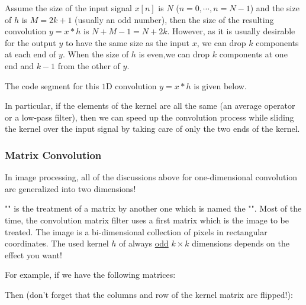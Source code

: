 	
	Assume the size of the input signal $x[n]$ is $N$ ($n=0,\cdots,n=N-1$) and the size of $h$ is $M=2k+1$ (usually an odd number), then the size of the resulting convolution $y=x*h$ is $N+M-1=N+2k$. However, as it is usually desirable for the output $y$ to have the same size as the input $x$, we can drop $k$ components at each end of $y$. When the size of $h$ is even,we can drop $k$ components at one end and $k-1$ from the other of $y$.
	
	The code segment for this $1$D convolution $y=x*h$ is given below. 
	
	In particular, if the elements of the kernel are all the same (an average operator or a low-pass filter), then we can speed up the convolution process while sliding the kernel over the input signal by taking care of only the two ends of the kernel.
	
	\subsubsection{Matrix Convolution}\label{matrix convolution}
	In image processing, all of the discussions above for one-dimensional convolution are generalized into two dimensions!
	
	"" is the treatment of a matrix by another one which is named the "". Most of the time, the convolution matrix filter uses a first matrix which is the image to be treated. The image is a bi-dimensional collection of pixels in rectangular coordinates. The used kernel $h$ of always \underline{odd} $k\times k$ dimensions  depends on the effect you want!
	
	
	For example, if we have the following matrices:
	
	Then (don't forget that the columns and row of the kernel matrix are flipped!):
	
